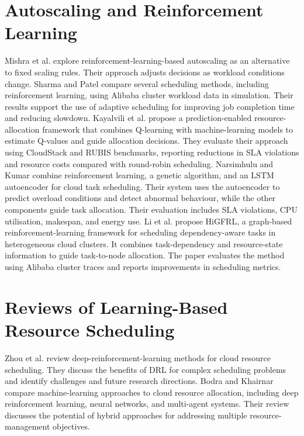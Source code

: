 \documentclass[12pt,a4paper]{report}
\begin{document}
\section{Autoscaling and Reinforcement Learning}
Mishra et al. explore reinforcement-learning-based autoscaling as an alternative to fixed scaling rules. Their approach adjusts decisions as workload conditions change. Sharma and Patel compare several scheduling methods, including reinforcement learning, using Alibaba cluster workload data in simulation. Their results support the use of adaptive scheduling for improving job completion time and reducing slowdown.
Kayalvili et al. propose a prediction-enabled resource-allocation framework that combines Q-learning with machine-learning models to estimate Q-values and guide allocation decisions. They evaluate their approach using CloudStack and RUBIS benchmarks, reporting reductions in SLA violations and resource costs compared with round-robin scheduling.
Narsimhulu and Kumar combine reinforcement learning, a genetic algorithm, and an LSTM autoencoder for cloud task scheduling. Their system uses the autoencoder to predict overload conditions and detect abnormal behaviour, while the other components guide task allocation. Their evaluation includes SLA violations, CPU utilisation, makespan, and energy use.
Li et al. propose HiGFRL, a graph-based reinforcement-learning framework for scheduling dependency-aware tasks in heterogeneous cloud clusters. It combines task-dependency and resource-state information to guide task-to-node allocation. The paper evaluates the method using Alibaba cluster traces and reports improvements in scheduling metrics.
\lipsum[19-21]

\section{Reviews of Learning-Based Resource Scheduling}
Zhou et al. review deep-reinforcement-learning methods for cloud resource scheduling. They discuss the benefits of DRL for complex scheduling problems and identify challenges and future research directions. Bodra and Khairnar compare machine-learning approaches to cloud resource allocation, including deep reinforcement learning, neural networks, and multi-agent systems. Their review discusses the potential of hybrid approaches for addressing multiple resource-management objectives.
\lipsum[22-23]
\end{document}
